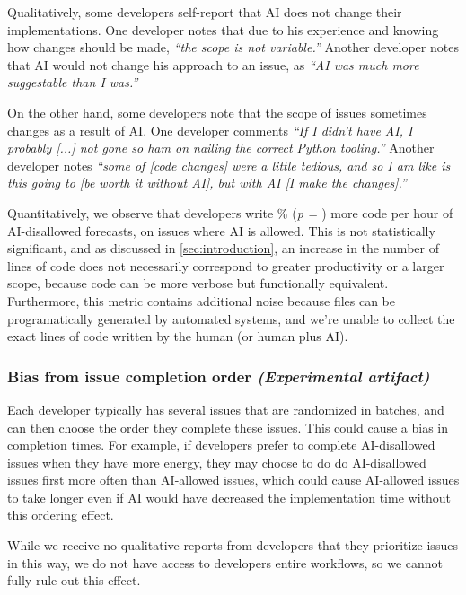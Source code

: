 \documentclass{article}
\newcommand{\devquote}[1]{\textcolor{quotecolor}{\textit{``#1''}}}
\begin{document}
Qualitatively, some developers self-report that AI does not change their implementations. One developer notes that due to his experience and knowing how changes should be made, \devquote{the scope is not variable.} Another developer notes that AI would not change his approach to an issue, as \devquote{AI was much more suggestable than I was.} 

On the other hand, some developers note that the scope of issues sometimes changes as a result of AI. One developer comments \devquote{If I didn't have AI, I probably [...] not gone so ham on nailing the correct Python tooling.} Another developer notes \devquote{some of [code changes] were a little tedious, and so I am like is this going to [be worth it without AI], but with AI [I make the changes].}


Quantitatively, we observe that developers write \PctMoreLinesOfCodeInAIAllowedIssuesPerAIDisallowedForecastedHour \% (\textit{p = \PValuePctMoreLinesOfCodeInAIAllowedIssuesPerAIDisallowedForecastedHour}) more code per hour of AI-disallowed forecasts, on issues where AI is allowed. This is not statistically significant, and as discussed in \autoref{sec:introduction}, an increase in the number of lines of code does not necessarily correspond to greater productivity or a larger scope, because code can be more verbose but functionally equivalent. Furthermore, this metric contains additional noise because files can be programatically generated by automated systems, and we're unable to collect the exact lines of code written by the human (or human plus AI).


\subsubsection{Bias from issue completion order \textnormal{\textit{(Experimental artifact)}}}
\label{sec:factor-bias-from-issue-completion-order}

Each developer typically has several issues that are randomized in batches, and can then choose the order they complete these issues. This could cause a bias in completion times. For example, if developers prefer to complete AI-disallowed issues when they have more energy, they may choose to do do AI-disallowed issues first more often than AI-allowed issues, which could cause AI-allowed issues to take longer even if AI would have decreased the implementation time without this ordering effect. 

While we receive no qualitative reports from developers that they prioritize issues in this way, we do not have access to developers entire workflows, so we cannot fully rule out this effect.
\end{document}
